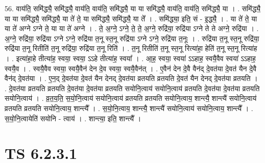 \documentclass[17pt]{extarticle}
\begin{document}
56. वाय॑ति॒ समि॑द्ध्यै॒ समि॑द्ध्यै॒ वाय॑ति॒ वाय॑ति॒ समि॑द्ध्यै॒ या या समि॑द्ध्यै॒ वाय॑ति॒ वाय॑ति॒ समि॑द्ध्यै॒ या । . समि॑द्ध्यै॒ या या समि॑द्ध्यै॒ समि॑द्ध्यै॒ या ते॑ ते॒ या समि॑द्ध्यै॒ समि॑द्ध्यै॒ या ते᳚ । . समि॑द्ध्या॒ इति॒ सं - इ॒द्ध्यै॒ । . या ते॑ ते॒ या या ते॑ अग्ने ऽग्ने ते॒ या या ते॑ अग्ने । . ते॒ अ॒ग्ने॒ ऽग्ने॒ ते॒ ते॒ अ॒ग्ने॒ रुद्रि॑या॒ रुद्रि॑या ऽग्ने ते ते अग्ने॒ रुद्रि॑या । . अ॒ग्ने॒ रुद्रि॑या॒ रुद्रि॑या ऽग्ने ऽग्ने॒ रुद्रि॑या त॒नू स्त॒नू रुद्रि॑या ऽग्ने ऽग्ने॒ रुद्रि॑या त॒नूः । . रुद्रि॑या त॒नू स्त॒नू रुद्रि॑या॒ रुद्रि॑या त॒नू रितीति॑ त॒नू रुद्रि॑या॒ रुद्रि॑या त॒नू रिति॑ । . त॒नू रितीति॑ त॒नू स्त॒नू रित्या॑हा॒ हेति॑ त॒नू स्त॒नू रित्या॑ह । . इत्या॑हा॒हे तीत्या॑ह॒ स्वया॒ स्वया॒ ऽऽहे तीत्या॑ह॒ स्वया᳚ । . आ॒ह॒ स्वया॒ स्वया॑ ऽऽहाह॒ स्वयै॒वैव स्वया॑ ऽऽहाह॒ स्वयै॒व । . स्वयै॒वैव स्वया॒ स्वयै॒वैन॑ देन दे॒व स्वया॒ स्वयै॒वैन॑त् । . ए॒वैन॑ देन दे॒वै वैन॑द् दे॒वत॑या दे॒वत॑ यैन दे॒वै वैन॑द् दे॒वत॑या । . ए॒न॒द् दे॒वत॑या दे॒वत॑ यैन देनद् दे॒वत॑या व्रतयति व्रतयति दे॒वत॑ यैन देनद् दे॒वत॑या व्रतयति । . दे॒वत॑या व्रतयति व्रतयति दे॒वत॑या दे॒वत॑या व्रतयति सयोनि॒त्वाय॑ सयोनि॒त्वाय॑ व्रतयति दे॒वत॑या दे॒वत॑या व्रतयति सयोनि॒त्वाय॑ । . व्र॒त॒य॒ति॒ स॒यो॒नि॒त्वाय॑ सयोनि॒त्वाय॑ व्रतयति व्रतयति सयोनि॒त्वाय॒ शान्त्यै॒ शान्त्यै॑ सयोनि॒त्वाय॑ व्रतयति व्रतयति सयोनि॒त्वाय॒ शान्त्यै᳚ । . स॒यो॒नि॒त्वाय॒ शान्त्यै॒ शान्त्यै॑ सयोनि॒त्वाय॑ सयोनि॒त्वाय॒ शान्त्यै᳚ । . स॒यो॒नि॒त्वायेति॑ सयोनि - त्वाय॑ । . शान्त्या॒ इति॒ शान्त्यै᳚ । \newline
\pagebreak
{}

\section{ TS 6.2.3.1 }
\end{document}
